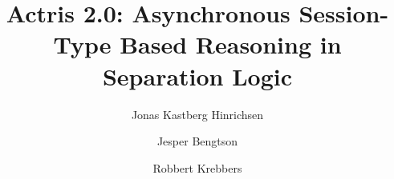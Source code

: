 \documentclass{lmcs} %
\theoremstyle{plain}\newtheorem{satz}[thm]{Satz} %
\begin{document}
\title{Actris 2.0: Asynchronous Session-Type Based Reasoning in Separation Logic}

\author{Jonas Kastberg Hinrichsen}	%
\address{IT University of Copenhagen, Denmark}	%

\author{Jesper Bengtson}	%
\address{IT University of Copenhagen, Denmark}	%

\author{Robbert Krebbers}	%
\address{Radboud University and Delft University of Technology, The Netherlands}	%




\begin{abstract}
  
\end{abstract}

\maketitle















\end{document}

